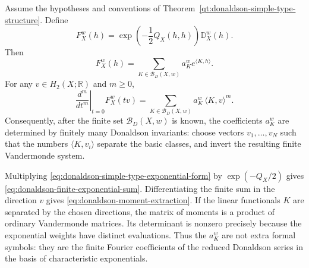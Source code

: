 \begin{remark}
\label{rem:donaldson-basic-coefficient-extraction}
Assume the hypotheses and conventions of
Theorem~\ref{qt:donaldson-simple-type-structure}.  Define
\[
  F_X^w(h)
  =
  \exp\!\left(-\frac{1}{2}Q_X(h,h)\right)\mathbb D_X^w(h).
\]
Then
\begin{equation}
  F_X^w(h)=\sum_{K\in\mathcal B_D(X,w)}a_K^w e^{\langle K,h\rangle}.
  \label{eq:donaldson-finite-exponential-sum}
\end{equation}
For any \(v\in H_2(X;\mathbb R)\) and \(m\ge0\),
\begin{equation}
  \left.\frac{d^m}{dt^m}\right|_{t=0}F_X^w(tv)
  =
  \sum_{K\in\mathcal B_D(X,w)}
  a_K^w\,\langle K,v\rangle^m.
  \label{eq:donaldson-moment-extraction}
\end{equation}
Consequently, after the finite set \(\mathcal B_D(X,w)\) is known, the
coefficients \(a_K^w\) are determined by finitely many Donaldson invariants:
choose vectors \(v_1,\ldots,v_N\) such that the numbers
\(\langle K,v_i\rangle\) separate the basic classes, and invert the resulting
finite Vandermonde system.

Multiplying \eqref{eq:donaldson-simple-type-exponential-form} by
\(\exp(-Q_X/2)\) gives
\eqref{eq:donaldson-finite-exponential-sum}.  Differentiating the finite sum
in the direction \(v\) gives \eqref{eq:donaldson-moment-extraction}.  If the
linear functionals \(K\) are separated by the chosen directions, the matrix of
moments is a product of ordinary Vandermonde matrices.  Its determinant is
nonzero precisely because the exponential weights have distinct evaluations.
Thus the \(a_K^w\) are not extra formal symbols: they are the finite Fourier
coefficients of the reduced Donaldson series in the basis of characteristic
exponentials.
\end{remark}


